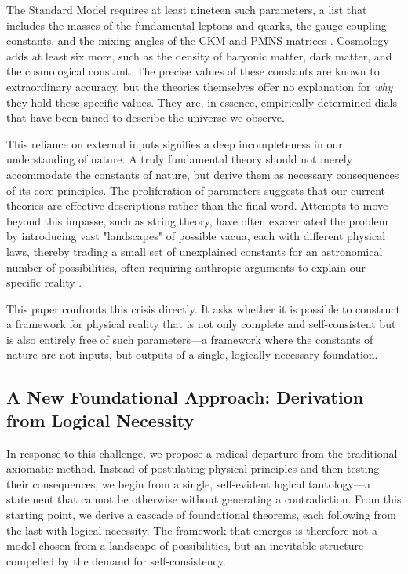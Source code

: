 \documentclass[11pt,a4paper]{article}
\begin{document}
The Standard Model requires at least nineteen such parameters, a list that includes the masses of the fundamental leptons and quarks, the gauge coupling constants, and the mixing angles of the CKM and PMNS matrices \citep{PDG2024}. Cosmology adds at least six more, such as the density of baryonic matter, dark matter, and the cosmological constant. The precise values of these constants are known to extraordinary accuracy, but the theories themselves offer no explanation for \textit{why} they hold these specific values. They are, in essence, empirically determined dials that have been tuned to describe the universe we observe.

This reliance on external inputs signifies a deep incompleteness in our understanding of nature. A truly fundamental theory should not merely accommodate the constants of nature, but derive them as necessary consequences of its core principles. The proliferation of parameters suggests that our current theories are effective descriptions rather than the final word. Attempts to move beyond this impasse, such as string theory, have often exacerbated the problem by introducing vast "landscapes" of possible vacua, each with different physical laws, thereby trading a small set of unexplained constants for an astronomical number of possibilities, often requiring anthropic arguments to explain our specific reality \citep{Susskind2003}.

This paper confronts this crisis directly. It asks whether it is possible to construct a framework for physical reality that is not only complete and self-consistent but is also entirely free of such parameters—a framework where the constants of nature are not inputs, but outputs of a single, logically necessary foundation.

\subsection{A New Foundational Approach: Derivation from Logical Necessity}
In response to this challenge, we propose a radical departure from the traditional axiomatic method. Instead of postulating physical principles and then testing their consequences, we begin from a single, self-evident logical tautology—a statement that cannot be otherwise without generating a contradiction. From this starting point, we derive a cascade of foundational theorems, each following from the last with logical necessity. The framework that emerges is therefore not a model chosen from a landscape of possibilities, but an inevitable structure compelled by the demand for self-consistency.
\end{document}
